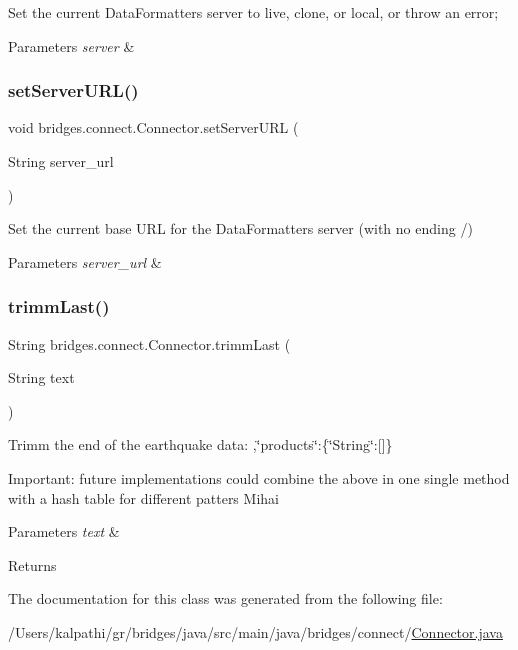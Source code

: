 Set the current Data\+Formatters server to live, clone, or local, or throw an error; 
\begin{DoxyParams}{Parameters}
{\em server} & \\
\hline
\end{DoxyParams}
\mbox{\label{classbridges_1_1connect_1_1_connector_a71f449c91e529f79730df27e01fdf674}} 
\subsubsection{\texorpdfstring{setServerURL()}{setServerURL()}}
{\footnotesize\ttfamily void bridges.\+connect.\+Connector.\+set\+Server\+U\+RL (\begin{DoxyParamCaption}\item[{String}]{server\+\_\+url }\end{DoxyParamCaption})}

Set the current base U\+RL for the Data\+Formatters server (with no ending /) 
\begin{DoxyParams}{Parameters}
{\em server\+\_\+url} & \\
\hline
\end{DoxyParams}
\mbox{\label{classbridges_1_1connect_1_1_connector_ac0dca0bd99b6abbbd8a77874a95e6d49}} 
\subsubsection{\texorpdfstring{trimmLast()}{trimmLast()}}
{\footnotesize\ttfamily String bridges.\+connect.\+Connector.\+trimm\+Last (\begin{DoxyParamCaption}\item[{String}]{text }\end{DoxyParamCaption})}

Trimm the end of the earthquake data\+: ,\char`\"{}products\char`\"{}\+:\{\char`\"{}\+String\char`\"{}\+:\mbox{[}\mbox{]}\}

Important\+: future implementations could combine the above in one single method with a hash table for different patters Mihai 
\begin{DoxyParams}{Parameters}
{\em text} & \\
\hline
\end{DoxyParams}
\begin{DoxyReturn}{Returns}

\end{DoxyReturn}


The documentation for this class was generated from the following file\+:\begin{DoxyCompactItemize}
\item 
/\+Users/kalpathi/gr/bridges/java/src/main/java/bridges/connect/\mbox{\hyperlink{_connector_8java}{Connector.\+java}}\end{DoxyCompactItemize}
